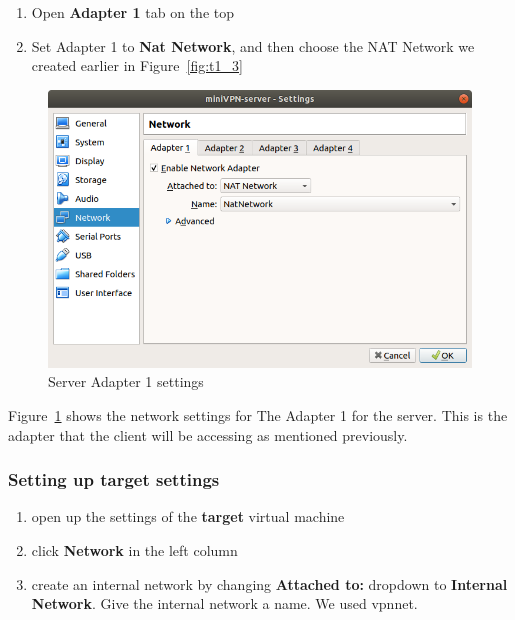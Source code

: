 \documentclass[12pt]{article}
\begin{document}
    \begin{enumerate}
        \item Open \textbf{Adapter 1} tab on the top
        \item Set Adapter 1 to \textbf{Nat Network}, and then choose the NAT Network we created earlier in Figure~\ref{fig:t1_3}
        
    \end{enumerate}
    \begin{figure}[H]
        \begin{center}
            \includegraphics[scale=0.5]{networking_server2.png}
        \end{center}{}
        \caption{Server Adapter 1 settings}
        \label{fig:networking_server_2}
    \end{figure}
    
    Figure~\ref{fig:networking_server_2} shows the network settings for The Adapter 1 for the server. This is the adapter that the client will be accessing as mentioned previously. 

\subsubsection{Setting up target settings}
    \begin{enumerate}
        \item open up the settings of the \textbf{target} virtual machine
        \item click \textbf{Network} in the left column
        \item create an internal network by changing \textbf{Attached to:} dropdown to \textbf{Internal Network}. Give the internal network a name. We used vpnnet.
    \end{enumerate}
    
\end{document}
